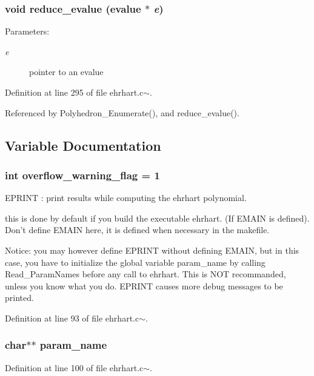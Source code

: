 \subsubsection{\setlength{\rightskip}{0pt plus 5cm}void reduce\_\-evalue (evalue $\ast$ {\em e})\hspace{0.3cm}{\tt  [static]}}\label{ehrhart_8c~_a13}


\begin{Desc}
\item[Parameters: ]\par
\begin{description}
\item[{\em 
e}]pointer to an evalue \end{description}
\end{Desc}


Definition at line 295 of file ehrhart.c$\sim$.

Referenced by Polyhedron\_\-Enumerate(), and reduce\_\-evalue().



\subsection{Variable Documentation}
\subsubsection{\setlength{\rightskip}{0pt plus 5cm}int overflow\_\-warning\_\-flag = 1}\label{ehrhart_8c~_a5}


EPRINT : print results while computing the ehrhart polynomial.

this is done by default if you build the executable ehrhart. (If EMAIN is defined). Don't define EMAIN here, it is defined when necessary in the makefile.





Notice: you may however define EPRINT without defining EMAIN, but in this case, you have to initialize the global variable param\_\-name by calling Read\_\-Param\-Names before any call to ehrhart. This is NOT recommanded, unless you know what you do. EPRINT causes more debug messages to be printed. 

Definition at line 93 of file ehrhart.c$\sim$.
\subsubsection{\setlength{\rightskip}{0pt plus 5cm}char$\ast$$\ast$ param\_\-name}\label{ehrhart_8c~_a6}




Definition at line 100 of file ehrhart.c$\sim$.